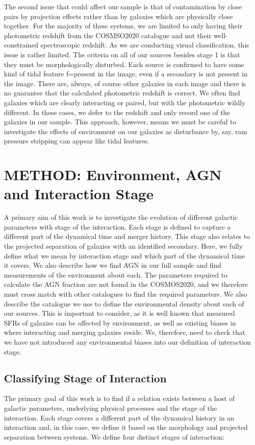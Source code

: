 The second issue that could affect our sample is that of contamination by close pairs by projection effects rather than by galaxies which are physically close together. For the majority of these systems, we are limited to only having their photometric redshift from the COSMSO2020 catalogue and not their well-constrained spectroscopic redshift. As we are conducting visual classification, this issue is rather limited. The criteria on all of our sources besides stage 1 is that they must be morphologically disturbed. Each source is confirmed to have some kind of tidal feature f=present in the image, even if a secondary is not present in the image. There are, always, of course other galaxies in each image and there is no guarantee that the calculated photometric redshift is correct. We often find galaxies which are clearly interacting or paired, but with the photometric wildly different. In these cases, we defer to the redshift and only record one of the galaxies in our sample. This approach, however, means we must be careful to investigate the effects of environment on our galaxies as disturbance by, say, ram pressure stripping can appear like tidal features.

\section{METHOD: Environment, AGN and Interaction Stage} \label{method}
A primary aim of this work is to investigate the evolution of different galactic parameters with stage of the interaction. Each stage is defined to capture a different part of the dynamical time and merger history. This stage also relates to the projected separation of galaxies with an identified secondary. Here, we fully define what we mean by interaction stage and which part of the dynamical time it covers. We also describe how we find AGN in our full sample and find measurements of the environment about each. The parameters required to calculate the AGN fraction are not found in the COSMOS2020, and we therefore must cross match with other catalogues to find the required parameters. We also describe the catalogue we use to define the environmental density about each of our sources. This is important to consider, as it is well known that measured SFRs of galaxies can be affected by environment, as well as existing biases in where interacting and merging galaxies reside. We, therefore, need to check that we have not introduced any environmental biases into our definition of interaction stage. 

\subsection{Classifying Stage of Interaction}\label{sec:staging}
The primary goal of this work is to find if a relation exists between a host of galactic parameters, underlying physical processes and the stage of the interaction. Each stage covers a different part of the dynamical history in an interaction and, in this case, we define it based on the morphology and projected separation between systems. We define four distinct stages of interaction:

